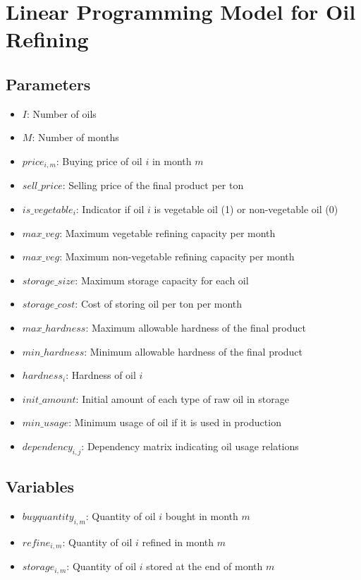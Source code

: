 \documentclass{article}
\begin{document}
\section*{Linear Programming Model for Oil Refining}

\subsection*{Parameters}
\begin{itemize}
    \item \( I \): Number of oils
    \item \( M \): Number of months
    \item \( price_{i,m} \): Buying price of oil \( i \) in month \( m \)
    \item \( sell\_price \): Selling price of the final product per ton
    \item \( is\_vegetable_{i} \): Indicator if oil \( i \) is vegetable oil (1) or non-vegetable oil (0)
    \item \( max\_veg \): Maximum vegetable refining capacity per month
    \item \( max\_veg \): Maximum non-vegetable refining capacity per month
    \item \( storage\_size \): Maximum storage capacity for each oil
    \item \( storage\_cost \): Cost of storing oil per ton per month
    \item \( max\_hardness \): Maximum allowable hardness of the final product
    \item \( min\_hardness \): Minimum allowable hardness of the final product
    \item \( hardness_{i} \): Hardness of oil \( i \)
    \item \( init\_amount \): Initial amount of each type of raw oil in storage
    \item \( min\_usage \): Minimum usage of oil if it is used in production
    \item \( dependency_{i,j} \): Dependency matrix indicating oil usage relations
\end{itemize}

\subsection*{Variables}
\begin{itemize}
    \item \( buyquantity_{i,m} \): Quantity of oil \( i \) bought in month \( m \)
    \item \( refine_{i,m} \): Quantity of oil \( i \) refined in month \( m \)
    \item \( storage_{i,m} \): Quantity of oil \( i \) stored at the end of month \( m \)
\end{itemize}
\end{document}
